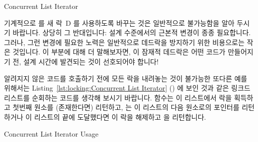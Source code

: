\fi

\begin{listing}[tbp]

\caption{Concurrent List Iterator}
\label{lst:locking:Concurrent List Iterator}
\end{listing}

기계적으로  를 새 락~D 를 사용하도록 바꾸는 것은 일반적으로
불가능함을 알아 두시기 바랍니다.
상당히 그 반대입니다: 설계 수준에서의 근본적 변경이 종종 필요합니다.
그러나, 그런 변경에 필요한 노력은 일반적으로 데드락을 방지하기 위한 비용으로는
작은 것입니다.
이 부분에 대해 더 말해보자면, 이 잠재적 데드락은 어떤 코드가 만들어지기 전,
설계 시간에 발견되는 것이 선호되어야 합니다!

알려지지 않은 코드를 호출하기 전에 모든 락을 내려놓는 것이 불가능한 또다른 예를
위해서는
Listing~\ref{lst:locking:Concurrent List Iterator} () 에
보인 것과 같은 링크드 리스트를 순회하는 코드를 생각해 보시기 바랍니다.
 함수는 이 리스트에서 락을 획득하고 첫번째 원소를 (존재한다면)
리턴하고,  는 이 리스트의 다음 원소로의 포인터를 리턴하거나 이
리스트의 끝에 도달했다면 이 락을 해제하고  을 리턴합니다.

\begin{listing}[tbp]

\caption{Concurrent List Iterator Usage}
\label{lst:locking:Concurrent List Iterator Usage}
\end{listing}


